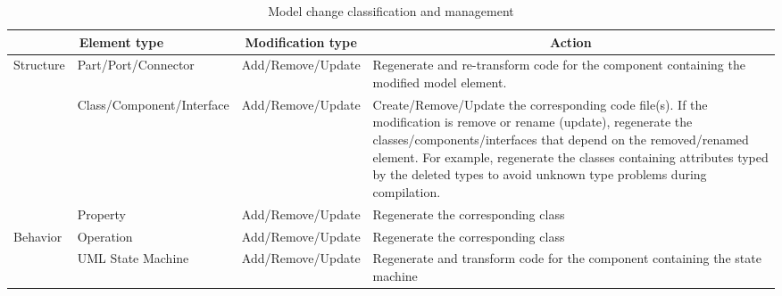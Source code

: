 \begin{table}[]
	\scriptsize
	\centering
	\caption{Model change classification and management}
	\label{table:modelchangeclassification}
	\begin{tabular}{|l|p{3cm}|l|p{9.5cm}|}
		\hline
		\multicolumn{2}{|c|}{Element type}                              & \multicolumn{1}{c|}{Modification type} & \multicolumn{1}{c|}{Action}                                                                              \\ \hline
		\multirow{3}{*}{Structure} & Part/Port/Connector                & Add/Remove/Update                      & Regenerate and re-transform code for the component containing the modified model element.                                                           \\ \cline{2-4} 
		& Class/Component/Interface          & Add/Remove/Update                      & Create/Remove/Update the corresponding code file(s). If the modification is remove or rename (update), regenerate the classes/components/interfaces that depend on the removed/renamed element. 
		For example, regenerate the classes containing attributes typed by the deleted types to avoid unknown type problems during compilation.                                                              \\ \cline{2-4} 
		& Property                           & Add/Remove/Update                      & Regenerate the corresponding class                                               \\ \hline
		Behavior  & Operation                          & Add/Remove/Update                      & Regenerate the corresponding class                           \\ \cline{2-4} 
		& UML State Machine & Add/Remove/Update                                 & Regenerate and transform code for the component containing the state machine                                           \\ \hline
	\end{tabular}
\end{table}

